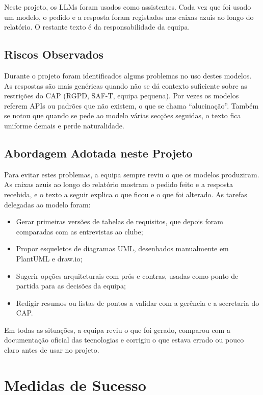 Neste projeto, os LLMs foram usados como assistentes. Cada vez que foi usado um modelo, o pedido e a resposta foram registados nas caixas azuis ao longo do relatório. O restante texto é da responsabilidade da equipa.

\subsection{Riscos Observados}

Durante o projeto foram identificados alguns problemas no uso destes modelos. As respostas são mais genéricas quando não se dá contexto suficiente sobre as restrições do CAP (RGPD, SAF-T, equipa pequena). Por vezes os modelos referem APIs ou padrões que não existem, o que se chama ``alucinação''. Também se notou que quando se pede ao modelo várias secções seguidas, o texto fica uniforme demais e perde naturalidade.

\subsection{Abordagem Adotada neste Projeto}

Para evitar estes problemas, a equipa sempre reviu o que os modelos produziram. As caixas azuis ao longo do relatório mostram o pedido feito e a resposta recebida, e o texto a seguir explica o que ficou e o que foi alterado. As tarefas delegadas ao modelo foram:

\begin{itemize}
    \item Gerar primeiras versões de tabelas de requisitos, que depois foram comparadas com as entrevistas ao clube;
    \item Propor esqueletos de diagramas UML, desenhados manualmente em PlantUML e draw.io;
    \item Sugerir opções arquiteturais com prós e contras, usadas como ponto de partida para as decisões da equipa;
    \item Redigir resumos ou listas de pontos a validar com a gerência e a secretaria do CAP.
\end{itemize}

Em todas as situações, a equipa reviu o que foi gerado, comparou com a documentação oficial das tecnologias \cite{efcore2023, nextjs2024, postgresql2024} e corrigiu o que estava errado ou pouco claro antes de usar no projeto.

\section{Medidas de Sucesso}

